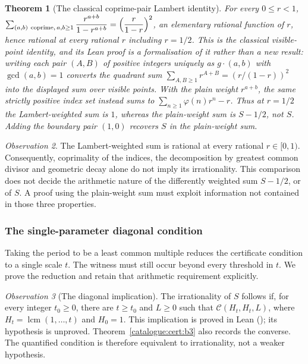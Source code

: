 \documentclass[11pt]{article}
\theoremstyle{plain}
\newtheorem{thm}{Theorem}[section]
\theoremstyle{definition}
\theoremstyle{remark}
\newtheorem{obs}[thm]{Observation}
\newcommand{\lean}[2]{\leanlink{#2}}
\let\origmathrm\mathrm
\renewcommand{\mathrm}[1]{\ifmmode\origmathrm{#1}\else\textrm{#1}\fi}%
\begin{document}
\begin{thm}[The classical coprime-pair Lambert identity]\label{thm:classical-coprime-pair-lambert-identity}
For every $0\le r<1$, $\sum_{(a,b)\ \mathrm{coprime},\, a,b\ge 1}
\dfrac{r^{a+b}}{1-r^{a+b}} = \Bigl(\dfrac{r}{1-r}\Bigr)^2$, an elementary
rational function of $r$, hence rational at every rational $r$ including
$r=1/2$. This is the classical visible-point identity, and its Lean proof is a formalisation of it rather than a new result: writing each
pair $(A,B)$ of positive integers uniquely as $g\cdot(a,b)$ with
$\gcd(a,b)=1$ converts the quadrant sum $\sum_{A,B\ge1}r^{A+B}=(r/(1-r))^2$
into the displayed sum over visible points. With the plain weight
$r^{a+b}$, the same strictly positive index set instead sums to
$\sum_{n\ge1}\varphi(n)r^n-r$. Thus at $r=1/2$ the Lambert-weighted
sum is $1$, whereas the plain-weight sum is $S-1/2$, not $S$.
Adding the boundary pair $(1,0)$ recovers $S$ in the plain-weight sum.
\end{thm}

\begin{obs}
The Lambert-weighted sum is rational at every rational $r\in[0,1)$.
Consequently, coprimality of the indices, the decomposition by greatest
common divisor and geometric decay alone do not imply its irrationality.
This comparison does not decide the arithmetic nature of the differently
weighted sum $S-1/2$, or of $S$. A proof using the plain-weight sum must
exploit information not contained in those three properties.
\end{obs}

\subsubsection{The single-parameter diagonal condition}

Taking the period to be a least common multiple reduces the certificate
condition to a single scale $t$. The witness must still occur beyond
every threshold in $t$. We prove the reduction and retain that arithmetic
requirement explicitly.


\begin{obs}[The diagonal implication]
The irrationality of $S$ follows if, for every integer $t_0\ge0$, there
are $t\ge t_0$ and $L\ge0$ such that $\mathcal C(H_t,H_t,L)$, where
$H_t=\operatorname{lcm}(1,\ldots,t)$ and $H_0=1$. This implication is
proved in Lean
(\lean{Erdos249257.TotientTailPeriodKiller.irrational_totient_series_of_lcm_diagonal_certificate_supply}{LcmDiagonalReduction.lean:112});
its hypothesis is unproved. Theorem~\ref{catalogue:cert:b3} also records the
converse. The quantified condition is therefore equivalent to
irrationality, not a weaker hypothesis.
\end{obs}
\end{document}
